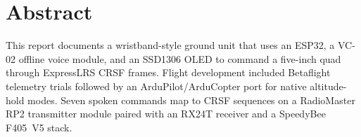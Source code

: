 \section*{Abstract}

This report documents a wristband-style ground unit that uses an ESP32, a VC-02 offline voice module,
and an SSD1306 OLED to command a five-inch quad through ExpressLRS CRSF frames.
Flight development included Betaflight telemetry trials followed by an ArduPilot/ArduCopter port for
native altitude-hold modes.
Seven spoken commands map to CRSF sequences on a RadioMaster RP2 transmitter module paired with an
RX24T receiver and a SpeedyBee F405~V5 stack.


